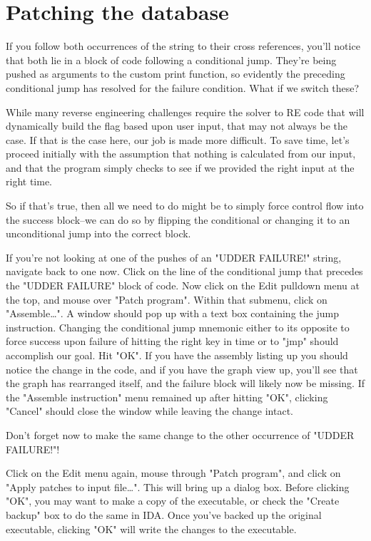 \documentclass[11pt]{article}
\begin{document}
\section{Patching the database}
\label{sec-6}
If you follow both occurrences of the string to their cross references, you'll
notice that both lie in a block of code following a conditional jump. They're
being pushed as arguments to the custom print function, so evidently the
preceding conditional jump has resolved for the failure condition. What if we
switch these?

While many reverse engineering challenges require the solver to RE code that
will dynamically build the flag based upon user input, that may not always be
the case. If that is the case here, our job is made more difficult. To save
time, let's proceed initially with the assumption that nothing is calculated
from our input, and that the program simply checks to see if we provided the
right input at the right time.

So if that's true, then all we need to do might be to simply force control
flow into the success block--we can do so by flipping the conditional or
changing it to an unconditional jump into the correct block.

If you're not looking at one of the pushes of an "UDDER FAILURE!" string,
navigate back to one now. Click on the line of the conditional jump that
precedes the "UDDER FAILURE" block of code. Now click on the Edit pulldown
menu at the top, and mouse over "Patch program". Within that submenu, click on
"Assemble\ldots{}". A window should pop up with a text box containing the jump
instruction. Changing the conditional jump mnemonic either to its opposite to
force success upon failure of hitting the right key in time or to "jmp" should
accomplish our goal. Hit "OK". If you have the assembly listing up you should
notice the change in the code, and if you have the graph view up, you'll see
that the graph has rearranged itself, and the failure block will likely now be
missing. If the "Assemble instruction" menu remained up after hitting "OK",
clicking "Cancel" should close the window while leaving the change intact.

Don't forget now to make the same change to the other occurrence of "UDDER
FAILURE!"!

Click on the Edit menu again, mouse through "Patch program", and click on
"Apply patches to input file\ldots{}". This will bring up a dialog box. Before
clicking "OK", you may want to make a copy of the executable, or check the
"Create backup" box to do the same in IDA. Once you've backed up the original
executable, clicking "OK" will write the changes to the executable.
\end{document}
